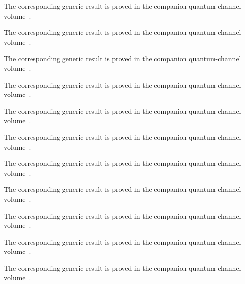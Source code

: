 The corresponding generic result is proved in the companion quantum-channel volume~\cite[``Compression cancels isometric expansion'']{QICLean2026Blueprint}.



The corresponding generic result is proved in the companion quantum-channel volume~\cite[``Reconstruction from a reference support'']{QICLean2026Blueprint}.



The corresponding generic result is proved in the companion quantum-channel volume~\cite[``Relative entropy under support compression'']{QICLean2026Blueprint}.



The corresponding generic result is proved in the companion quantum-channel volume~\cite[``Functional calculus under transpose'']{QICLean2026Blueprint}.




The corresponding generic result is proved in the companion quantum-channel volume~\cite[``Logarithm of a positive square root'']{QICLean2026Blueprint}.



The corresponding generic result is proved in the companion quantum-channel volume~\cite[``Logarithm of a real power'']{QICLean2026Blueprint}.



The corresponding generic result is proved in the companion quantum-channel volume~\cite[``Support-aware vector-state Jensen inequality for the logarithm'']{QICLean2026Blueprint}.



The corresponding generic result is proved in the companion quantum-channel volume~\cite[``Order-two sandwiched trace functional'']{QICLean2026Blueprint}.



The corresponding generic result is proved in the companion quantum-channel volume~\cite[``Nonnegativity of the order-two functional'']{QICLean2026Blueprint}.



The corresponding generic result is proved in the companion quantum-channel volume~\cite[``Faithful cyclic form of the order-two functional'']{QICLean2026Blueprint}.



The corresponding generic result is proved in the companion quantum-channel volume~\cite[``Relative entropy bounded by the faithful order-two functional'']{QICLean2026Blueprint}.



